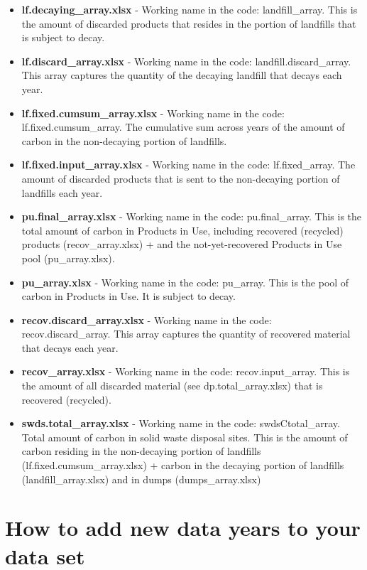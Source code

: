 \documentclass[
  openany]{book}
\begin{document}
\begin{itemize}
\item
  \textbf{lf.decaying\_array.xlsx} - Working name in the code:
  landfill\_array. This is the amount of discarded products that resides
  in the portion of landfills that is subject to decay.
\item
  \textbf{lf.discard\_array.xlsx} - Working name in the code:
  landfill.discard\_array. This array captures the quantity of the
  decaying landfill that decays each year.
\item
  \textbf{lf.fixed.cumsum\_array.xlsx} - Working name in the code:
  lf.fixed.cumsum\_array. The cumulative sum across years of the amount
  of carbon in the non-decaying portion of landfills.
\item
  \textbf{lf.fixed.input\_array.xlsx} - Working name in the code:
  lf.fixed\_array. The amount of discarded products that is sent to the
  non-decaying portion of landfills each year.
\item
  \textbf{pu.final\_array.xlsx} - Working name in the code:
  pu.final\_array. This is the total amount of carbon in Products in
  Use, including recovered (recycled) products (recov\_array.xlsx) + and
  the not-yet-recovered Products in Use pool (pu\_array.xlsx).
\item
  \textbf{pu\_array.xlsx} - Working name in the code: pu\_array. This is
  the pool of carbon in Products in Use. It is subject to decay.
\item
  \textbf{recov.discard\_array.xlsx} - Working name in the code:
  recov.discard\_array. This array captures the quantity of recovered
  material that decays each year.
\item
  \textbf{recov\_array.xlsx} - Working name in the code:
  recov.input\_array. This is the amount of all discarded material (see
  dp.total\_array.xlsx) that is recovered (recycled).
\item
  \textbf{swds.total\_array.xlsx} - Working name in the code:
  swdsCtotal\_array. Total amount of carbon in solid waste disposal
  sites. This is the amount of carbon residing in the non-decaying
  portion of landfills (lf.fixed.cumsum\_array.xlsx) + carbon in the
  decaying portion of landfills (landfill\_array.xlsx) and in dumps
  (dumps\_array.xlsx)
\end{itemize}

\hypertarget{dnld-add}{%
\section{How to add new data years to your data set}\label{dnld-add}}
\end{document}
